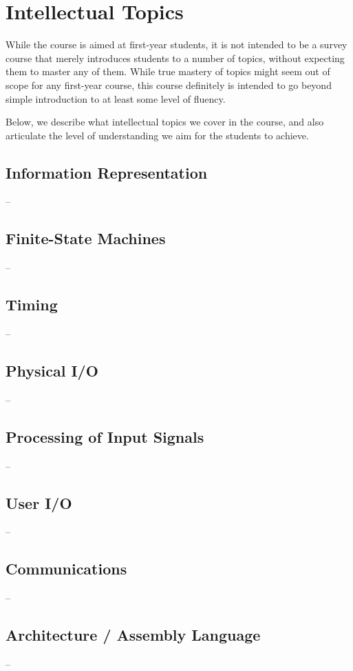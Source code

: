 \section{Intellectual Topics}
\label{sec:topics}

While the course is aimed at first-year students, it is not intended
to be a survey course that merely introduces students to a number of
topics, without expecting them to master any of them.
While true mastery of topics might seem out of scope for
any first-year course, this course definitely is intended to go
beyond simple introduction to at least some level of fluency.

Below, we describe what intellectual
topics we cover in the course, and also articulate the level
of understanding we aim for the students to achieve.

\subsection{Information Representation} --
\label{sec:ip}

\subsection{Finite-State Machines} --
\label{sec:fsm}

\subsection{Timing} --
\label{sec:time}

\subsection{Physical I/O} --
\label{sec:pio}

\subsection{Processing of Input Signals} --
\label{sec:pis}

\subsection{User I/O} --
\label{sec:uio}

\subsection{Communications} --
\label{sec:comm}

\subsection{Architecture / Assembly Language} --
\label{sec:arch}

